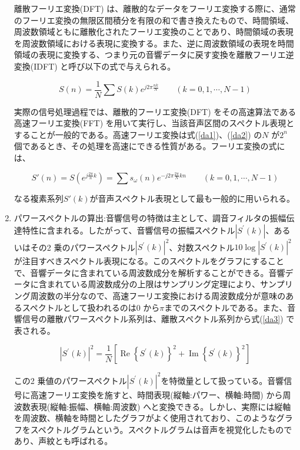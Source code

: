 \begin{enumerate}
離散フーリエ変換(DFT) は、離散的なデータをフーリエ変換する際に、通常のフーリエ変換の無限区間積分を有限の和で書き換えたもので、時間領域、周波数領域ともに離散化されたフーリエ変換のことであり、時間領域の表現を周波数領域における表現に変換する。また、逆に周波数領域の表現を時間領域の表現に変換する、つまり元の音響データに戻す変換を離散フーリエ逆変換(IDFT) と呼び以下の式で与えられる。

\begin{equation}
S(n)=\frac{1}{N}\sum S(k)e^{j2\pi \frac{nk}{N}} \qquad (k=0,1,\cdots,N-1)
\end{equation}

実際の信号処理過程では、離散的フーリエ変換(DFT) をその高速算法である高速フーリエ変換(FFT) を用いて実行し、当該音声区間のスペクトル表現とすることが一般的である。高速フーリエ変換は式(\ref{da1})、(\ref{da2}) の$N$ が$2^n$ 個であるとき、その処理を高速にできる性質がある。フーリエ変換の式には、

\begin{equation}
S\prime(n)=S(e^{j\frac{2\pi}{n}k})=\sum s_\omega(n)e^{-j2\pi \frac{2\pi}{N}kn} \qquad (k=0,1,\cdots,N-1)
\end{equation}

なる複素系列$S\prime(k)$が音声スペクトル表現として最も一般的に用いられる。

\item パワースペクトルの算出:音響信号の特徴は主として、調音フィルタの振幅伝達特性に含まれる。したがって、音響信号の振幅スペクトル$|S^\prime(k)|$、あるいはその2 乗のパワースペクトル$|S^\prime(k)|^2$、対数スペクトル$10\log|S^\prime(k)|^2$が注目すべきスペクトル表現になる。このスペクトルをグラフにすることで、音響データに含まれている周波数成分を解析することができる。音響データに含まれている周波数成分の上限はサンプリング定理により、サンプリング周波数の半分なので、高速フーリエ変換における周波数成分が意味のあるスペクトルとして扱われるのは0 から$\pi$までのスペクトルである。また、音響信号の離散パワースペクトル系列は、離散スペクトル系列から式(\ref{da3}) で表される。

\begin{equation}
\label{da3}
|S^\prime(k)|^2=\frac{1}{N}[\operatorname{Re}\left\{S^\prime(k)\right\}^2+\operatorname{Im}\left\{S^\prime(k)\right\}^2]
\end{equation}

この2 乗値のパワースペクトル$|S^\prime(k)|^2$を特徴量として扱っている。音響信号に高速フーリエ変換を施すと、時間表現(縦軸:パワー、横軸:時間) から周波数表現(縦軸:振幅、横軸:周波数) へと変換できる。しかし、実際には縦軸を周波数、横軸を時間としたグラフがよく使用されており、このようなグラフをスペクトルグラムという。スペクトルグラムは音声を視覚化したものであり、声紋とも呼ばれる。

\end{enumerate}\par
